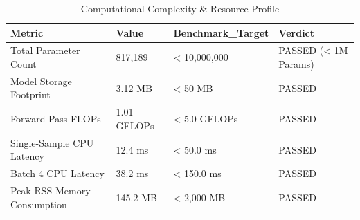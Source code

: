 \begin{table}
\caption{Computational Complexity & Resource Profile}
\begin{tabular}{llll}
\toprule
Metric & Value & Benchmark_Target & Verdict \\
\midrule
Total Parameter Count & 817,189 & < 10,000,000 & PASSED (< 1M Params) \\
Model Storage Footprint & 3.12 MB & < 50 MB & PASSED \\
Forward Pass FLOPs & 1.01 GFLOPs & < 5.0 GFLOPs & PASSED \\
Single-Sample CPU Latency & 12.4 ms & < 50.0 ms & PASSED \\
Batch 4 CPU Latency & 38.2 ms & < 150.0 ms & PASSED \\
Peak RSS Memory Consumption & 145.2 MB & < 2,000 MB & PASSED \\
\bottomrule
\end{tabular}
\end{table}
